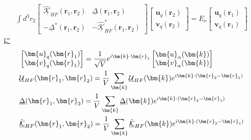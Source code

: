 \documentclass[dvipdfmx, 11pt, a4paper]{jsarticle}
\numberwithin{equation}{section}
\theoremstyle{definition}
\begin{document}
    \begin{derivationBox}
        \begin{align}
            \int d^3r_2 \left[ 
                \begin{matrix}
                    \underline{\hat{\mathcal{K}}}_{HF}(\bm{r}_1,\bm{r}_2)&\underline{\Delta}(\bm{r}_1,\bm{r}_2)\\
                    -\underline{\Delta}^*(\bm{r}_1,\bm{r}_2)&-\underline{\hat{\mathcal{K}}}_{HF}^*(\bm{r}_1,\bm{r}_2)
                \end{matrix}
                \right]
                \left[
                \begin{matrix}
                    \bm{u}_q(\bm{r}_2)\\
                    \bm{v}_q(\bm{r}_2)
                \end{matrix}
                \right]
                =E_\nu
                \left[
                \begin{matrix}
                    \bm{u}_q(\bm{r}_1)\\
                    \bm{v}_q(\bm{r}_1)
                \end{matrix}
                \right] 
        \end{align}
        に
        \begin{align}
            &\left[
            \begin{matrix}
                \bm{u}_{q}(\bm{r}_1)\\
                \bm{v}_{q}(\bm{r}_1)
            \end{matrix}
            \right]
            =
            \frac{1}{\sqrt{V}}  e^{i\bm{k}\cdot \bm{r}_1}
            \left[
            \begin{matrix}
                \bm{u}_\alpha(\bm{k})\\
                \bm{v}_\alpha(\bm{k})
            \end{matrix}
            \right]  \notag  \\
            &\underline{\mathcal{U}}_{HF}(\bm{r}_1,\bm{r}_2) = \frac{1}{V}\sum_{\bm{k}} \underline{\mathcal{U}}_{HF}(\bm{k})e^{i\bm{k}\cdot(\bm{r}_2-\bm{r}_1)} \notag  \\
            &\underline{\Delta}(\bm{r}_1,\bm{r}_2) = \frac{1}{V}\sum_{\bm{k}} \underline{\Delta}(\bm{k})e^{i\bm{k}\cdot(\bm{r}_2-\bm{r}_1)} \notag \\
            &\hat{\underline{\mathcal{K}}}_{HF}(\bm{r}_1,\bm{r}_2) = \frac{1}{V}\sum_{\bm{k}} \hat{\underline{\mathcal{K}}}_{HF}(\bm{k}) e^{i\bm{k}\cdot(\bm{r}_2-\bm{r}_1)} \notag 

\end{align}
\end{derivationBox}
\end{document}
